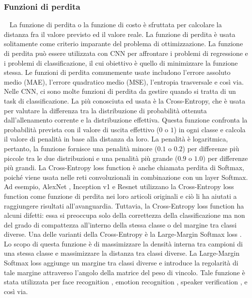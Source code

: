 \subsubsection{Funzioni di perdita}~\newline
\label{subsubsec:loss}
La funzione di perdita o la funzione di costo è sfruttata per calcolare la distanza fra il valore previsto ed il 
valore reale. La funzione di perdita è usata solitamente come criterio imparante del problema di ottimizzazione. 
La funzione di perdita può essere utilizzata con CNN per affrontare i problemi di regressione e i problemi di
classificazione, il cui obiettivo è quello di minimizzare la funzione stessa. Le funzioni di perdita comunemente usate
includono l'errore assoluto medio (MAE), l'errore quadratico medio (MSE), l'entropia trasversale e così via. 
Nelle CNN, ci sono molte funzioni di perdita da gestire quando si tratta di un task di classificazione. La più
conosciuta ed usata è la Cross-Entropy, che è usata per valutare la differenza tra la distribuzione di probabilità
ottenuta dall'allenamento corrente e la distribuzione effettiva. 
Questa funzione confronta la probabilità prevista con il valore di uscita effettivo ($0$ o $1$) in ogni classe 
e calcola il valore di penalità in base alla distanza da loro. La penalità è logaritmica, pertanto, la funzione 
fornisce una penalità minore ($0.1$ o $0.2$) per differenze più piccole tra le due distribuzioni e una penalità 
più grande ($0.9$ o $1.0$) per differenze più grandi.
La Cross-Entropy loss function è anche chiamata perdita di Softmax, poiché viene usata nelle reti convoluzionali 
in combinazione con un layer Softmax.
Ad esempio, AlexNet \cite{krizhevsky2017imagenet}, Inception v1 \cite{szegedy2015going} e Resnet \cite{he2016deep}
utilizzano la Cross-Entropy loss function come funzione di perdita nei loro articoli originali e ciò li ha aiutati 
a raggiungere risultati all'avanguardia. Tuttavia, la Cross-Entropy loss function ha alcuni difetti: essa si 
preoccupa solo della correttezza della classificazione ma non del grado di compattezza all'interno della stessa
classe o del margine tra classi diverse. 
Una delle varianti della Cross-Entropy è la Large-Margin Softmax loss \cite{liu2016large}. Lo scopo di questa 
funzione è di massimizzare la densità interna tra campioni di una stessa classe e massimizzare la distanza tra 
classi diverse. 
La Large-Margin Softmax loss aggiunge un margine tra classi diverse e introduce la regolarità di tale margine 
attraverso l'angolo della matrice del peso di vincolo. Tale funzione è stata utilizzata per face recognition 
\cite{liu2016large}, emotion recognition \cite{tan2017group}, speaker verification \cite{liu2019large}, e così via.

